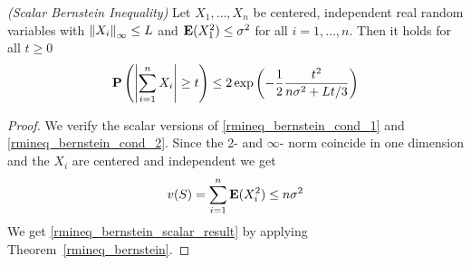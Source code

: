 \begin{corollary}
  \emph{(Scalar Bernstein Inequality)}
  \label{rmineq_bernstein_scalar}
Let
$
  X_1, \ldots , X_n
$
be centered, independent real random variables with
$
  \left\lVert X_i\right\rVert_\infty
  \le
  L
$
and
$
  \mathbf{E}(X_1^2)
  \le
  \sigma^2
$
for all $i = 1, \ldots, n$.
Then it holds for all $ t \ge 0 $
\begin{gather}
  \label{rmineq_bernstein_scalar_result}
  \P
  \left( 
    \left| 
      \sum_{i = 1}^{n} 
        X_i
    \right|
    \ge
    t
  \right)
  \le
  2
  \exp
  \left( 
    -
    \frac{1}{2}
    \frac{t^2}
    {
      n\sigma^2 
      +
      Lt/3
    }
  \right)
\end{gather}
\end{corollary}
\begin{proof}
  We verify the scalar versions of
  \eqref{rmineq_bernstein_cond_1}
  and
  \eqref{rmineq_bernstein_cond_2}.
  Since the 2- and $\infty$- norm coincide in one dimension and
  the $X_i$ are centered and independent we get
  \begin{gather}
    v(S)
    =
    \sum_{i = 1}^{n}
        \mathbf{E}(X_i^2)
    \le
    n\sigma^2
  \end{gather}
  We get \eqref{rmineq_bernstein_scalar_result}
  by applying Theorem~\ref{rmineq_bernstein}.
\end{proof}

